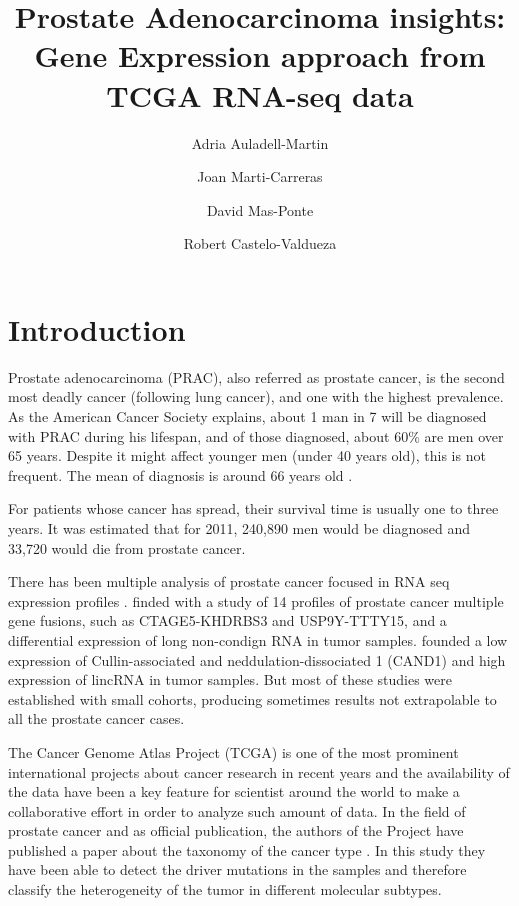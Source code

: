 \documentclass[9pt,twocolumn,twoside]{gsajnl}
\title{Prostate Adenocarcinoma insights: Gene Expression approach from TCGA RNA-seq data}
\author[$\ast$,$\dagger$]{Adria Auladell-Martin}
\author[$\ast$,$\dagger$]{Joan Marti-Carreras}
\author[$\ast$,$\dagger$]{David Mas-Ponte}
\author[$\ast$,1]{Robert Castelo-Valdueza}
\affil[$\ast$]{M.Sc. in Bioinformatics at Department of Experimental and Health Sciences (CEXS), Universitat Pompeu Fabra}
\affil[$\dagger$]{Authors Contributed Equally to this work}
\begin{document}
\maketitle
\thispagestyle{firststyle}
\marginmark
\firstpagefootnote
{}
\vspace{-11pt}%

\section*{Introduction}

Prostate adenocarcinoma (PRAC), also referred as prostate cancer, is  the second most deadly cancer (following lung cancer), and one with the highest prevalence. As the American Cancer Society explains, about 1 man in 7 will be diagnosed with PRAC during his lifespan, and of those diagnosed, about 60\% are men over 65 years. Despite it might affect younger men (under 40 years old), this is not frequent. The mean of diagnosis is around 66 years old \citep{prostatestatistics}.

For patients whose cancer has spread, their survival time is usually one to three years. It was estimated that for 2011, 240,890 men would be diagnosed and 33,720 would die from prostate cancer. 

There has been multiple analysis of prostate cancer focused in RNA seq expression profiles \citep{rnaseq1,rnaseq2,zhai,rnaseq4}. \cite{rnaseq1} finded with a study of 14 profiles of prostate cancer multiple gene fusions, such as CTAGE5-KHDRBS3 and USP9Y-TTTY15, and a differential expression of long non-condign RNA in tumor samples. \cite{zhai} founded a low expression of Cullin-associated and neddulation-dissociated 1 (CAND1) and high expression of lincRNA in tumor samples.  But most of these studies were established with small cohorts, producing sometimes results not extrapolable to all the prostate cancer cases.

 The Cancer Genome Atlas Project (TCGA) \citep{tgca} is one of the most prominent international projects about cancer research in recent years and the availability of the data have been a key feature for scientist around the world to make a collaborative effort in order to analyze such amount of data. In the field of prostate cancer and as official publication, the authors of the Project have published a paper about the taxonomy of the cancer type \citep{Abeshouse2015}. In this study they have been able to detect the driver mutations in the samples and therefore classify the heterogeneity of the tumor in different molecular subtypes. 
 
\end{document}
